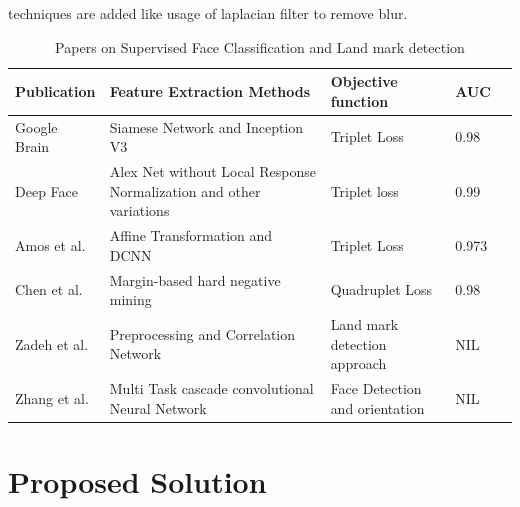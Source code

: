 \documentclass[a4paper,12pt, twoside]{NITKReport}
\begin{document}
techniques are added like usage of laplacian filter to remove blur.  

\begin{table}
  \centering
\begin{tabular}{ |p{3cm}|p{3cm}|p{2.5cm}|p{2cm}|p{2cm}|}
 \hline
 Publication & Feature Extraction Methods & Objective function & AUC\\
 \hline
 Google Brain \cite{schroff2015facenet} & Siamese Network and Inception V3 & Triplet Loss & 0.98\\
 \hline
 Deep Face \cite{parkhi2015deep} & Alex Net without Local Response Normalization and other variations \cite{DBLP:journals/corr/SimonyanZ14a} & Triplet loss & 0.99 \\
\hline
  Amos et al. \cite{amos2016openface} & Affine Transformation and DCNN & Triplet Loss & 0.973\\ 
 \hline
  Chen et al.\cite{chen2017beyond} & Margin-based hard negative mining & Quadruplet Loss & 0.98 \\
 \hline
 Zadeh et al.\cite{zadeh2017convolutional} & Preprocessing and Correlation Network & Land mark detection approach & NIL \\ 
 \hline
Zhang et al. \cite{zhang2016joint} & Multi Task cascade convolutional Neural Network & Face Detection and orientation  & NIL \\
\hline
\end{tabular}
\caption{Papers on Supervised Face Classification and Land mark detection}\label{table:papers1}
\end{table}




\newpage
\chapter{Proposed Solution}
\label{solution}
\end{document}
